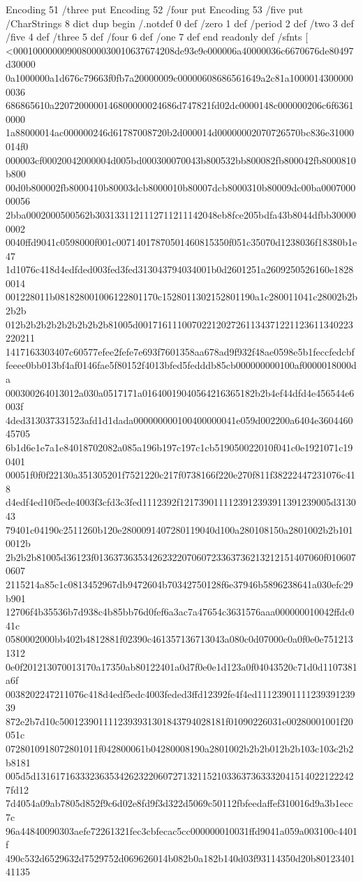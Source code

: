 Encoding 51 /three put
Encoding 52 /four put
Encoding 53 /five put
/CharStrings 8 dict dup begin
/.notdef 0 def
/zero 1 def
/period 2 def
/two 3 def
/five 4 def
/three 5 def
/four 6 def
/one 7 def
end readonly def
/sfnts [
<000100000009008000030010637674208de93e9e000006a40000036c6670676de80497d30000
0a1000000a1d676c79663f0fb7a20000009c00000608686561649a2c81a10000143000000036
686865610a2207200000146800000024686d747821fd02dc0000148c000000206c6f63610000
1a88000014ac000000246d61787008720b2d000014d00000002070726570bc836e31000014f0
000003cf00020042000004d005bd000300070043b800532bb800082fb800042fb8000810b800
00d0b800002fb8000410b80003dcb8000010b80007dcb8000310b80009dc00ba000700000056
2bba0002000500562b3031331121112711211142048eb8fce205bdfa43b8044dfbb300000002
0040ffd9041c0598000f001c00714017870501460815350f051c35070d1238036f18380b1e47
1d1076c418d4edfded003fed3fed313043794034001b0d2601251a2609250526160e18280014
001228011b081828001006122801170c1528011302152801190a1c280011041c28002b2b2b2b
012b2b2b2b2b2b2b2b2b81005d00171611100702212027261134371221123611340223220211
1417163303407c60577efee2fefe7e693f7601358aa678ad9f932f48ae0598e5b1feccfedcbf
feeee0bb013bf4af0146fae5f80152f4013bfed5fedddb85cb000000000100af0000018000da
000300264013012a030a0517171a01640019040564216365182b2b4ef44dfd4e456544e6003f
4ded313037331523afd1d1dada000000000100400000041e059d002200a6404e360446045705
6b1d6e1e7a1e84018702082a085a196b197c197c1cb519050022010f041c0e1921071c190401
00051f0f0f22130a351305201f7521220c217f0738166f220e270f811f38222447231076c418
d4edf4ed10f5ede4003f3cfd3c3fed1112392f1217390111123912393911391239005d313043
79401c04190c2511260b120e2800091407280119040d100a280108150a2801002b2b1010012b
2b2b2b81005d36123f01363736353426232207060723363736213212151407060f0106070607
2115214a85c1c0813452967db9472604b70342750128f6e37946b5896238641a030efc29b901
12706f4b35536b7d938c4b85bb76d0fef6a3ac7a47654c3631576aaa000000010042ffdc041c
0580002000bb402b4812881f02390c461357136713043a080c0d07000c0a0f0e0e7512131312
0e0f201213070013170a17350ab80122401a0d7f0e0e1d123a0f04043520c71d0d1107381a6f
0038202247211076c418d4edf5edc4003feded3ffd12392fe4f4ed1112390111123939123939
872e2b7d10c5001239011112393931301843794028181f01090226031e00280001001f20051c
0728010918072801011f042800061b04280008190a2801002b2b2b012b2b103c103c2b2b8181
005d5d131617163332363534262322060727132115210336373633320415140221222427fd12
7d4054a09ab7805d852f9c6d02e8fd9f3d322d5069c50112fbfeedaffef310016d9a3b1ecc7c
96a44840090303aefe72261321fec3cbfecac5cc000000010031ffd9041a059a003100c4401f
490c532d6529632d7529752d069626014b082b0a182b140d03f93114350d20b8012340141135
